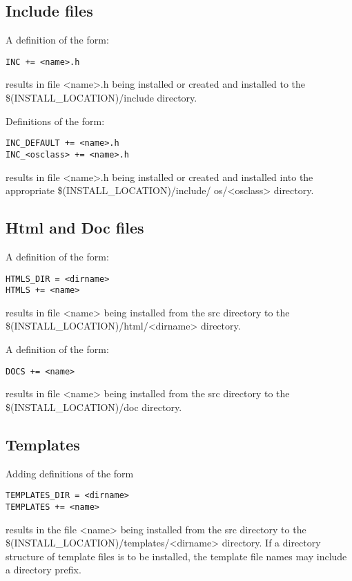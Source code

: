 \subsection{Include files}

A definition of the form:

\begin{verbatim}INC += <name>.h
\end{verbatim}results in file \textless{}name\textgreater{}.h being installed or created and installed to the \$(INSTALL\_LOCATION)/include directory. 

Definitions of the form:

\begin{verbatim}INC_DEFAULT += <name>.h
INC_<osclass> += <name>.h
\end{verbatim}results in file \textless{}name\textgreater{}.h being installed or created and installed into the appropriate \$(INSTALL\_LOCATION)/include/
os/\textless{}osclass\textgreater{} directory.

\subsection{Html and Doc files}

A definition of the form:

\begin{verbatim}HTMLS_DIR = <dirname>
HTMLS += <name>
\end{verbatim}results in file \textless{}name\textgreater{} being installed from the src directory to the \$(INSTALL\_LOCATION)/html/\textless{}dirname\textgreater{} directory. 

A definition of the form:

\begin{verbatim}DOCS += <name>
\end{verbatim}results in file \textless{}name\textgreater{} being installed from the src directory to the \$(INSTALL\_LOCATION)/doc directory. 

\subsection{Templates}

Adding definitions of the form

\begin{verbatim}TEMPLATES_DIR = <dirname>
TEMPLATES += <name>
\end{verbatim}results in the file \textless{}name\textgreater{} being installed from the src directory to the \$(INSTALL\_LOCATION)/templates/\textless{}dirname\textgreater{} 
directory. If a directory structure of template files is to be installed, the template file names may include a directory prefix.


